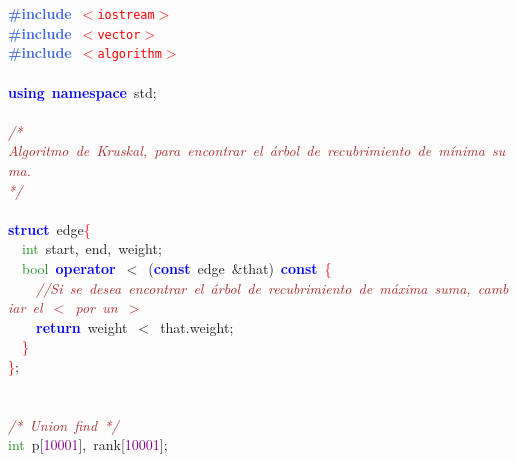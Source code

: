 
{\ttfamily \raggedright {
\noindent
\mbox{}\textbf{\textcolor{RoyalBlue}{\#include}}\ \texttt{\textcolor{Red}{$<$iostream$>$}} \\
\mbox{}\textbf{\textcolor{RoyalBlue}{\#include}}\ \texttt{\textcolor{Red}{$<$vector$>$}} \\
\mbox{}\textbf{\textcolor{RoyalBlue}{\#include}}\ \texttt{\textcolor{Red}{$<$algorithm$>$}} \\
\mbox{} \\
\mbox{}\textbf{\textcolor{Blue}{using}}\ \textbf{\textcolor{Blue}{namespace}}\ std\textcolor{BrickRed}{;} \\
\mbox{} \\
\mbox{}\textit{\textcolor{Brown}{/*}} \\
\mbox{}\textit{\textcolor{Brown}{Algoritmo\ de\ Kruskal,\ para\ encontrar\ el\ árbol\ de\ recubrimiento\ de\ mínima\ suma.}} \\
\mbox{}\textit{\textcolor{Brown}{*/}} \\
\mbox{} \\
\mbox{}\textbf{\textcolor{Blue}{struct}}\ edge\textcolor{Red}{\{} \\
\mbox{}\ \ \textcolor{ForestGreen}{int}\ start\textcolor{BrickRed}{,}\ end\textcolor{BrickRed}{,}\ weight\textcolor{BrickRed}{;} \\
\mbox{}\ \ \textcolor{ForestGreen}{bool}\ \textbf{\textcolor{Blue}{operator}}\ \textcolor{BrickRed}{$<$}\ \textcolor{BrickRed}{(}\textbf{\textcolor{Blue}{const}}\ edge\ \textcolor{BrickRed}{\&}that\textcolor{BrickRed}{)}\ \textbf{\textcolor{Blue}{const}}\ \textcolor{Red}{\{} \\
\mbox{}\ \ \ \ \textit{\textcolor{Brown}{//Si\ se\ desea\ encontrar\ el\ árbol\ de\ recubrimiento\ de\ máxima\ suma,\ cambiar\ el\ $<$\ por\ un\ $>$}} \\
\mbox{}\ \ \ \ \textbf{\textcolor{Blue}{return}}\ weight\ \textcolor{BrickRed}{$<$}\ that\textcolor{BrickRed}{.}weight\textcolor{BrickRed}{;} \\
\mbox{}\ \ \textcolor{Red}{\}} \\
\mbox{}\textcolor{Red}{\}}\textcolor{BrickRed}{;} \\
\mbox{} \\
\mbox{} \\
\mbox{}\textit{\textcolor{Brown}{/*\ Union\ find\ */}} \\
\mbox{}\textcolor{ForestGreen}{int}\ p\textcolor{BrickRed}{[}\textcolor{Purple}{10001}\textcolor{BrickRed}{],}\ rank\textcolor{BrickRed}{[}\textcolor{Purple}{10001}\textcolor{BrickRed}{];} \\
}}
